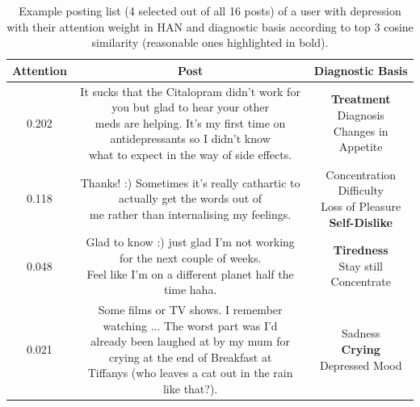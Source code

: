\begin{table}[t]
    \centering
	\small
    \begin{tabular}{ccc}
        \hline
        Attention & Post & Diagnostic Basis \\
        \hline
        0.202 & \makecell[l]{It sucks that the Citalopram didn't work for you but glad to hear your other \\ meds are helping. It's my first time on antidepressants so I didn't know \\ what to expect in the way of side effects.} & \makecell[c]{\textbf{Treatment} \\ Diagnosis \\ Changes in Appetite }\\
        \hline
        0.118 & \makecell[l]{Thanks! :) Sometimes it's really cathartic to actually get the words out of  \\ me rather than internalising my feelings.} & \makecell[c]{Concentration Difficulty \\ Loss of Pleasure \\ \textbf{Self-Dislike}}\\
        \hline
        0.048 & \makecell[l]{Glad to know :) just glad I'm not working for the next couple of weeks. \\ Feel like I'm on a different planet half the time haha.} & \makecell[c]{\textbf{Tiredness} \\ Stay still \\ Concentrate} \\
        \hline
        0.021 & \makecell[l]{Some films or TV shows. I remember watching ... The worst part was I'd  \\ already been laughed at by my mum for crying at the end of Breakfast at \\ Tiffanys (who leaves a cat out in the rain like that?). } & \makecell[c]{Sadness \\ \textbf{Crying} \\ Depressed Mood} \\
        \hline
        \end{tabular}
        \caption{\label{table:example} Example posting list (4 selected out of all 16 posts) of a user with depression with their attention weight in HAN and diagnostic basis according to top 3 cosine similarity (reasonable ones highlighted in bold).}
\end{table}


